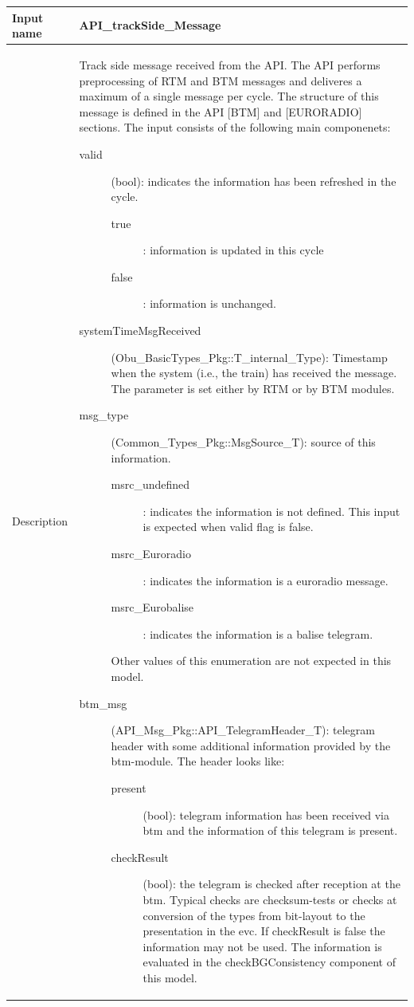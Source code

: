 \begin{longtable}{p{}p{}}
\toprule
Input name				& API\_trackSide\_Message \\
\midrule
Description				& Track side message received from the API. The API performs preprocessing of RTM and BTM messages and deliveres a maximum of a single message per cycle. The structure of this message is defined in the API [BTM] and [EURORADIO] sections. The input consists of the following main componenets:
\begin{description}
\item[valid](bool): indicates the information has been refreshed in the cycle.
\begin{description}
\item[true]: information is updated in this cycle
\item[false]: information is unchanged.
\end{description}
\item[systemTimeMsgReceived](Obu\_BasicTypes\_Pkg::T\_internal\_Type): Timestamp when the system (i.e., the train) has received the message. The parameter is set either by RTM or by BTM modules.
\item[msg\_type](Common\_Types\_Pkg::MsgSource\_T): source of this information. 
\begin{description}
\item[msrc\_undefined]: indicates the information is not defined. This input is expected when valid flag is false.
\item[msrc\_Euroradio]: indicates the information is a euroradio message.
\item[msrc\_Eurobalise]: indicates the information is a balise telegram.
\end{description}
Other values of this enumeration are not expected in this model.
\item[btm\_msg](API\_Msg\_Pkg::API\_TelegramHeader\_T): telegram header with some additional information provided by the btm-module. The header looks like:
\begin{description}
\item[present](bool): telegram information has been received via btm and the information of this telegram is present. 
\item[checkResult](bool): the telegram is checked after reception at the btm. Typical checks are checksum-tests or checks at conversion of the types from bit-layout to the presentation in the evc. If checkResult is false the information may not be used. The information is evaluated in the checkBGConsistency component of this model.

\end{description}
\end{description}
\end{longtable}
